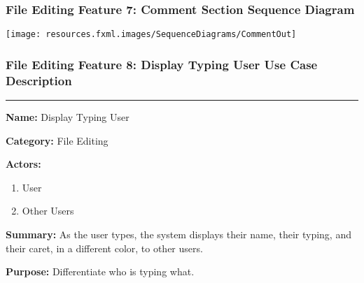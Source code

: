\documentclass[twoside,letterpaper]{article}
\begin{document}
\subsubsection[File Editing Feature 7: Comment Section Sequence Diagram]{\rmfamily\bfseries\color{black}
	File Editing Feature 7: Comment Section Sequence Diagram}
\hypertarget{RefHeading22059017292}{}

\bigskip

\texttt{[image: resources.fxml.images/SequenceDiagrams/CommentOut]}

\newpage

\subsubsection[File Editing Feature 8: Display Typing User]{\rmfamily\bfseries\color{black}
	File Editing Feature 8: Display Typing User Use Case Description}
\hypertarget{RefHeading22059017292}{}

\vspace{2pt}
\hrule
\vspace{8pt}
	\noindent\textbf{Name:} Display Typing User \newline
	
	\noindent\textbf{Category:} File Editing \newline
	
	\noindent\textbf{Actors:} 
	\begin{enumerate}
		\item User
		\item Other Users
	\end{enumerate}
	\noindent\textbf{Summary:} As the user types, the system displays their name, their typing, and their caret, in a different color, to other users. \newline
	
	\noindent\textbf{Purpose:} Differentiate who is typing what. \newline
	
\end{document}
